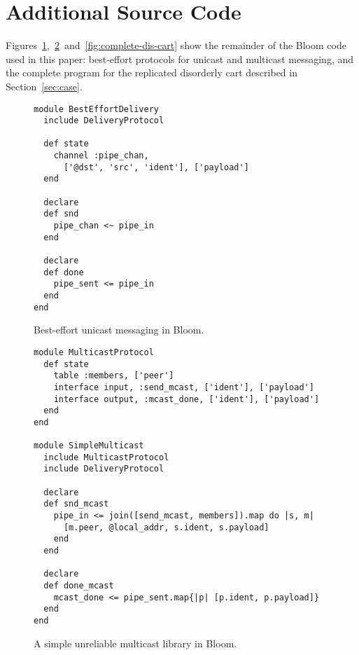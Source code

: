 \section{Additional Source Code}
Figures~\ref{fig:delivery-impl},~\ref{fig:multicast-impl}~and~\ref{fig:complete-dis-cart}
show the remainder of the Bloom code used in this paper: best-effort protocols
for unicast and multicast messaging, and the complete program for the replicated
disorderly cart described in Section~\ref{sec:case}.

\label{app:network-code}

\begin{figure}[h]
\begin{scriptsize}
\begin{lstlisting}
module BestEffortDelivery
  include DeliveryProtocol

  def state
    channel :pipe_chan,
      ['@dst', 'src', 'ident'], ['payload']
  end

  declare
  def snd
    pipe_chan <~ pipe_in
  end

  declare
  def done
    pipe_sent <= pipe_in
  end
end
\end{lstlisting}
\centering
\vspace{-10pt}
\caption{Best-effort unicast messaging in Bloom.}
\label{fig:delivery-impl}
\end{scriptsize}
\vspace{-2pt}
\end{figure}


\begin{figure}[h]
\begin{scriptsize}
\begin{lstlisting}
module MulticastProtocol
  def state
    table :members, ['peer']
    interface input, :send_mcast, ['ident'], ['payload']
    interface output, :mcast_done, ['ident'], ['payload']
  end
end

module SimpleMulticast
  include MulticastProtocol
  include DeliveryProtocol

  declare
  def snd_mcast
    pipe_in <= join([send_mcast, members]).map do |s, m|
      [m.peer, @local_addr, s.ident, s.payload]
    end
  end

  declare
  def done_mcast
    mcast_done <= pipe_sent.map{|p| [p.ident, p.payload]}
  end
end
\end{lstlisting}
\centering
\vspace{-10pt}
\caption{A simple unreliable multicast library in Bloom.}
\label{fig:multicast-impl}
\end{scriptsize}
\vspace{-2pt}
\end{figure}


